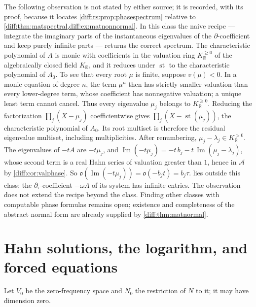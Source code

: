 \documentclass[11pt,letterpaper]{article}
\numberwithin{equation}{section}
\theoremstyle{definition}
\theoremstyle{remark}
\newcommand{\R}{\mathbb R}
\newcommand{\der}{\partial}
\newcommand{\Acl}{\mathcal A}
\newcommand{\Obs}{\mathfrak o}
\newcommand{\st}{\operatorname{st}}
\newcommand{\Imm}{\operatorname{Im}}
\newcommand{\derT}{\der_{\tau}}
\newcommand{\KR}{K_{\R}}
\begin{document}
\begin{remark}
\label{diff:rs:rem:eigenrecipe}
The following observation is not stated by either source; it is recorded, with
its proof, because it locates \cref{diff:rs:prop:phasespectrum} relative to
\cref{diff:thm:matspectral,diff:ex:matnonnormal}. In this class the naive
recipe --- integrate the imaginary parts of the instantaneous eigenvalues of the
$\der$-coefficient and keep purely infinite parts --- returns the correct
spectrum. The characteristic polynomial of $A$ is monic with coefficients in
the valuation ring $\KR^{\geq0}$ of the algebraically closed field $\KR$, and it
reduces under $\st$ to the characteristic polynomial of $A_{0}$.
To see that every root $\mu$ is finite, suppose $v(\mu)<0$.
In a monic equation of degree $n$, the term $\mu^n$ then has
strictly smaller valuation than every lower-degree term, whose
coefficient has nonnegative valuation; a unique least term cannot
cancel. Thus every eigenvalue $\mu_j$ belongs to $\KR^{\geq0}$.
Reducing the factorization $\prod_j(X-\mu_j)$ coefficientwise gives
$\prod_j(X-\st(\mu_j))$, the characteristic polynomial of $A_0$.
Its root multiset is therefore the residual eigenvalue multiset,
including multiplicities. After renumbering,
$\mu_j-\lambda_j\in\KR^{>0}$. The eigenvalues of $-tA$ are $-t\mu_j$, and
$\Imm(-t\mu_{j})=-t\,b_{j}-t\,\Imm(\mu_{j}-\lambda_{j})$, whose second term is a
real Hahn series of valuation greater than $1$, hence in $\Acl$ by
\cref{diff:cor:valphase}. So $\Obs(\Imm(-t\mu_{j}))=\Obs(-b_{j}t)=b_{j}\tau$.
 lies outside this class: the $\derT$-coefficient
$-\omega A$ of its system has infinite entries. The observation does not
extend the recipe beyond the class. Finding other classes with computable phase
formulas remains open; existence and completeness of the abstract normal form
are already supplied by \cref{diff:thm:matnormal}.
\end{remark}

\section{Hahn solutions, the logarithm, and forced equations}
\label{diff:rs:sec:logs}

Let $V_{0}$ be the zero-frequency space and $N_{0}$ the restriction of $N$ to
it; it may have dimension zero.
\end{document}
